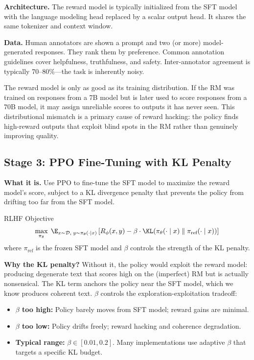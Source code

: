 \textbf{Architecture.} The reward model is typically initialized from the SFT model with the language modeling head replaced by a scalar output head. It shares the same tokenizer and context window.

\textbf{Data.} Human annotators are shown a prompt and two (or more) model-generated responses. They rank them by preference. Common annotation guidelines cover helpfulness, truthfulness, and safety. Inter-annotator agreement is typically 70--80\%---the task is inherently noisy.

\begin{warningbox}
The reward model is only as good as its training distribution. If the RM was trained on responses from a 7B model but is later used to score responses from a 70B model, it may assign unreliable scores to outputs it has never seen. This distributional mismatch is a primary cause of reward hacking: the policy finds high-reward outputs that exploit blind spots in the RM rather than genuinely improving quality.
\end{warningbox}

\subsection{Stage 3: PPO Fine-Tuning with KL Penalty}

\textbf{What it is.} Use PPO to fine-tune the SFT model to maximize the reward model's score, subject to a KL divergence penalty that prevents the policy from drifting too far from the SFT model.

\begin{mathresult}{RLHF Objective}
\begin{equation}
\max_{\pi_\theta}\; \E_{x \sim \mathcal{D},\; y \sim \pi_\theta(\cdot \mid x)}\left[R_\phi(x, y) - \beta \cdot \KL\!\left(\pi_\theta(\cdot \mid x)\;\|\;\pi_{\text{ref}}(\cdot \mid x)\right)\right]
\end{equation}
where $\pi_{\text{ref}}$ is the frozen SFT model and $\beta$ controls the strength of the KL penalty.
\end{mathresult}

\textbf{Why the KL penalty?} Without it, the policy would exploit the reward model: producing degenerate text that scores high on the (imperfect) RM but is actually nonsensical. The KL term anchors the policy near the SFT model, which we know produces coherent text. $\beta$ controls the exploration-exploitation tradeoff:
\begin{itemize}
    \item \textbf{$\beta$ too high:} Policy barely moves from SFT model; reward gains are minimal.
    \item \textbf{$\beta$ too low:} Policy drifts freely; reward hacking and coherence degradation.
    \item \textbf{Typical range:} $\beta \in [0.01, 0.2]$. Many implementations use adaptive $\beta$ that targets a specific KL budget.
\end{itemize}

